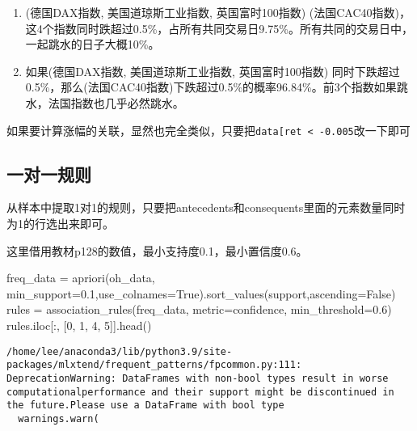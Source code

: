 \documentclass[
  letterpaper,
  DIV=11,
  numbers=noendperiod]{scrreprt}
\newenvironment{Shaded}{\begin{snugshade}}{\end{snugshade}}
\newcommand{\DecValTok}[1]{\textcolor[rgb]{0.68,0.00,0.00}{#1}}
\newcommand{\FloatTok}[1]{\textcolor[rgb]{0.68,0.00,0.00}{#1}}
\newcommand{\NormalTok}[1]{\textcolor[rgb]{0.00,0.23,0.31}{#1}}
\newcommand{\OperatorTok}[1]{\textcolor[rgb]{0.37,0.37,0.37}{#1}}
\newcommand{\StringTok}[1]{\textcolor[rgb]{0.13,0.47,0.30}{#1}}
\newcommand{\VariableTok}[1]{\textcolor[rgb]{0.07,0.07,0.07}{#1}}
\providecommand{\tightlist}{%
  \setlength{\itemsep}{0pt}\setlength{\parskip}{0pt}}\usepackage{longtable,booktabs,array}
\begin{document}
\begin{enumerate}
\def\labelenumi{\arabic{enumi}.}
\tightlist
\item
  (德国DAX指数, 美国道琼斯工业指数, 英国富时100指数)
  (法国CAC40指数)，这4个指数同时跌超过0.5\%，占所有共同交易日9.75\%。所有共同的交易日中，一起跳水的日子大概10\%。
\item
  如果(德国DAX指数, 美国道琼斯工业指数, 英国富时100指数)
  同时下跌超过0.5\%，那么(法国CAC40指数)下跌超过0.5\%的概率96.84\%。前3个指数如果跳水，法国指数也几乎必然跳水。
\end{enumerate}

如果要计算涨幅的关联，显然也完全类似，只要把\texttt{data{[}\textquotesingle{}ret\textquotesingle{}{]}\ \textless{}\ -0.005}改一下即可

\hypertarget{ux4e00ux5bf9ux4e00ux89c4ux5219}{%
\subsection{一对一规则}\label{ux4e00ux5bf9ux4e00ux89c4ux5219}}

从样本中提取1对1的规则，只要把antecedents和consequents里面的元素数量同时为1的行选出来即可。

这里借用教材p128的数值，最小支持度0.1，最小置信度0.6。

\begin{Shaded}
\begin{Highlighting}[]
\NormalTok{freq\_data }\OperatorTok{=}\NormalTok{ apriori(oh\_data, min\_support}\OperatorTok{=}\FloatTok{0.1}\NormalTok{,use\_colnames}\OperatorTok{=}\VariableTok{True}\NormalTok{).sort\_values(}\StringTok{\textquotesingle{}support\textquotesingle{}}\NormalTok{,ascending}\OperatorTok{=}\VariableTok{False}\NormalTok{)}
\NormalTok{rules }\OperatorTok{=}\NormalTok{ association\_rules(freq\_data, metric}\OperatorTok{=}\StringTok{\textquotesingle{}confidence\textquotesingle{}}\NormalTok{, min\_threshold}\OperatorTok{=}\FloatTok{0.6}\NormalTok{)}
\NormalTok{rules.iloc[:, [}\DecValTok{0}\NormalTok{, }\DecValTok{1}\NormalTok{, }\DecValTok{4}\NormalTok{, }\DecValTok{5}\NormalTok{]].head()}
\end{Highlighting}
\end{Shaded}

\begin{verbatim}
/home/lee/anaconda3/lib/python3.9/site-packages/mlxtend/frequent_patterns/fpcommon.py:111: DeprecationWarning: DataFrames with non-bool types result in worse computationalperformance and their support might be discontinued in the future.Please use a DataFrame with bool type
  warnings.warn(
\end{verbatim}
\end{document}
